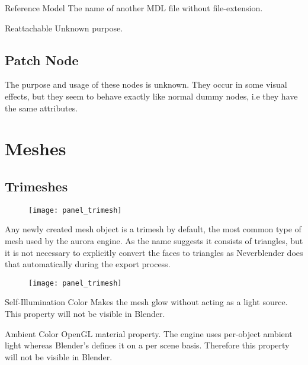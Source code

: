 \begin{propertyAurora}{Reference Model}
The name of another MDL file without file-extension.
\end{propertyAurora}

\begin{propertyAurora}{Reattachable}
Unknown purpose.
\end{propertyAurora}

\subsection{Patch Node}
The purpose and usage of these nodes is unknown. They occur in some visual effects, but
they seem to behave exactly like normal dummy nodes, i.e they have the same
attributes.

\section{Meshes}

\subsection{Trimeshes}

\begin{figure}
    \centering
    \texttt{[image: panel\_trimesh]}
    \label{fig:panel_trimesh}
\end{figure}

Any newly created mesh object is a trimesh by default, the most common type of mesh 
used by the aurora engine. As the name suggests it consists of triangles, but it is 
not necessary to explicitly convert the faces to triangles as Neverblender does that 
automatically during the export process.

\begin{figure}
    \centering
    \texttt{[image: panel\_trimesh]}
    \label{fig:panel_trimesh}
\end{figure}

\begin{propertyAurora}{Self-Illumination Color}
Makes the mesh glow without acting as a light source.
This property will not be visible in Blender.
\end{propertyAurora}

\begin{propertyAurora}{Ambient Color}
OpenGL material property. The engine uses per-object ambient light whereas Blender's 
defines it on a per scene basis. Therefore this property will not be visible in Blender.
\end{propertyAurora}

